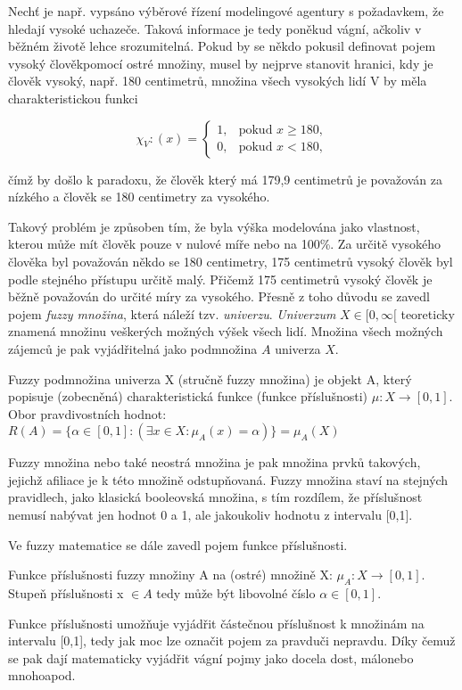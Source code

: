Nech\v t je např. vypsáno výběrové řízení modelingové agentury s požadavkem, že hledají vysoké uchazeče. Taková informace je tedy poněkud vágní, ačkoliv v běžném životě lehce srozumitelná. Pokud by se někdo pokusil definovat pojem \clqq vysoký člověk\crqq \space pomocí ostré množiny, musel by nejprve stanovit hranici, kdy je člověk vysoký, např. 180 centimetr\r u, množina všech vysokých lidí V by měla charakteristickou funkci

    $$\chi_V:(x)=\begin{cases} 1, & \mbox{pokud }  x \geq 180,\\    0, & \mbox{pokud } x < 180,  \end{cases}$$

    čímž by došlo k paradoxu, že člověk který má 179,9 centimetr\r u je považován za nízkého a člověk se 180 centimetry za vysokého.

    Takový problém je zp\r usoben tím, že byla výška modelována jako vlastnost, kterou m\r uže mít člověk pouze v nulové míře nebo na 100\%. Za určitě vysokého člověka byl považován někdo se 180 centimetry, 175 centimetr\r u vysoký člověk byl podle stejného přístupu určitě malý. Přičemž 175 centimetr\r u vysoký člověk je běžně považován do určité míry za vysokého. Přesně z toho d\r uvodu se zavedl pojem \textit{fuzzy množina}, která náleží tzv. \textit{univerzu}. \textit{Univerzum} $X \in [0,\infty[$ teoreticky znamená množinu veškerých možných výšek všech lidí. Množina všech možných zájemc\r u je pak vyjádřitelná jako podmnožina $A$ univerza $X.$
    \begin{definition}
    \cite{navara}
        Fuzzy podmnožina univerza X (stručně fuzzy množina) je objekt A, který popisuje (zobecněná) charakteristická funkce (funkce příslušnosti) $\mu: X \rightarrow [0,1]$. Obor pravdivostních hodnot: $R(A) = \{\alpha \in [0,1]: (\exists x \in X : \mu_A(x) = \alpha)\} = \mu_A(X)$
    \end{definition}
    Fuzzy množina nebo také neostrá množina je pak množina prvků takových, jejichž afiliace je k této množině odstupňovaná. Fuzzy množina staví na stejných pravidlech, jako klasická booleovská množina, s tím rozdílem, že příslušnost nemusí nabývat jen hodnot 0 a 1, ale jakoukoliv hodnotu z intervalu [0,1]. 
    
    Ve fuzzy matematice se dále zavedl pojem funkce příslušnosti.
    \begin{definition}
        \cite{Kolo} Funkce příslušnosti fuzzy množiny A na (ostré) množině X: $\mu_A : X \rightarrow  [0,1].$ Stupe\v n příslušnosti x $\in A$ tedy m\r uže být libovolné číslo $\alpha \in [0,1]$.
    \end{definition}
    Funkce příslušnosti umož\v nuje vyjádřit částečnou příslušnost k množinám na intervalu [0,1], tedy jak moc lze označit pojem za \clqq pravdu\crqq \space či \clqq nepravdu\crqq. Díky čemuž se pak dají matematicky vyjádřit vágní pojmy jako \clqq docela dost\crqq, \clqq málo\crqq \space nebo \clqq mnoho\crqq \space apod.

